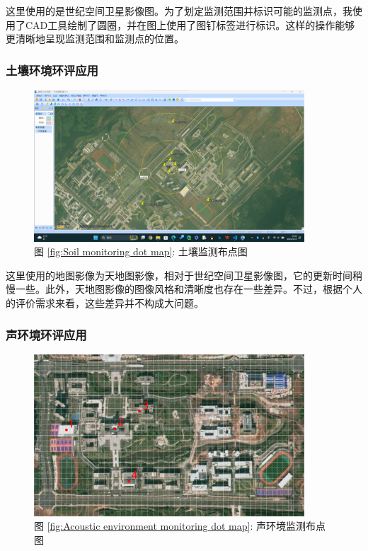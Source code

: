 \documentclass{cdut_thesis_twoside}
\begin{document}
这里使用的是世纪空间卫星影像图。为了划定监测范围并标识可能的监测点，我使用了CAD工具绘制了圆圈，并在图上使用了图钉标签进行标识。这样的操作能够更清晰地呈现监测范围和监测点的位置。



\subsubsection{土壤环境环评应用}

\begin{figure}[H]
    \centering
    \includegraphics[width=0.9\textwidth]{figures/Soil monitoring dot map.png}
    \caption*{图 \ref{fig:Soil monitoring dot map}: 土壤监测布点图}
\end{figure}

这里使用的地图影像为天地图影像，相对于世纪空间卫星影像图，它的更新时间稍慢一些。此外，天地图影像的图像风格和清晰度也存在一些差异。不过，根据个人的评价需求来看，这些差异并不构成大问题。



\subsubsection{声环境环评应用}

\begin{figure}[H]
    \centering
    \includegraphics[width=0.9\textwidth]{figures/Acoustic environment monitoring dot map.png}
    \caption*{图 \ref{fig:Acoustic environment monitoring dot map}: 声环境监测布点图}
\end{figure}
\end{document}
